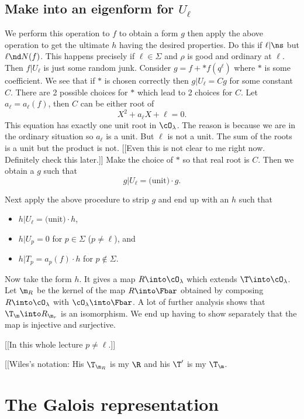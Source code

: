 \documentclass{report}
\begin{document}
\subsection{Make into an eigenform for $U_{\ell}$}
We perform this operation to $f$ to obtain a form $g$ then apply
the above operation to get the ultimate $h$ having the desired properties.
Do this if $\ell|\ns$ but $\ell\nd N(f)$. This happens precisely
if $\ell\in\Sigma$ and $\rho$ is good and ordinary at $\ell$.
Then $f|U_{\ell}$ is just some random junk. Consider
$g=f+*f(q^{\ell})$ where $*$ is some coefficient.
We see that if $*$ is chosen correctly then
$g|U_{\ell}=Cg$ for some constant $C$. There are 2 possible
choices for $*$ which lead to 2 choices for $C$. Let $a_{\ell}=a_{\ell}(f)$,
then $C$ can be either root of
$$X^2+a_{\ell}X+\ell=0.$$
This equation has exactly one unit root in $\cO_{\lambda}$. The reason
is because we are in the ordinary situation so $a_{\ell}$ is a unit. But
$\ell$ is not a unit. The sum of the roots is a unit but the product
is not. [[Even this is not clear to me right now. Definitely
check this later.]]
Make the choice of $*$ so that real root is $C$. Then we obtain
a $g$ such that
$$g|U_{\ell}=\text{(unit)}\cdot g.$$

Next apply the above procedure to strip $g$ and end up with an $h$ such that
\begin{itemize}
\item $h|U_{\ell}=\text{(unit)}\cdot h$,
\item $h|U_p=0$ for $p\in\Sigma$ ($p\neq\ell$), and
\item $h|T_p=a_p(f)\cdot h$ for $p\not\in\Sigma$.
\end{itemize}

Now take the form $h$. It gives a map
$R\into\cO_{\lambda}$ which extends $\T\into\cO_{\lambda}$.
Let $\m_R$ be the kernel of the map $R\into\Fbar$
obtained by composing $R\into\cO_{\lambda}$
with $\cO_{\lambda}\into\Fbar$. A lot of further analysis
shows that $\T_{\m}\into R_{\m_r}$ is an isomorphism.
We end up having to show separately that the map is injective
and surjective.

[[In this whole lecture $p\neq\ell$.]]

[[Wiles's notation: His $\T_{\m_R}$ is my $\R$ and his $\T'$ is my
$\T_{\m}$.

\section{The Galois representation}
\end{document}
